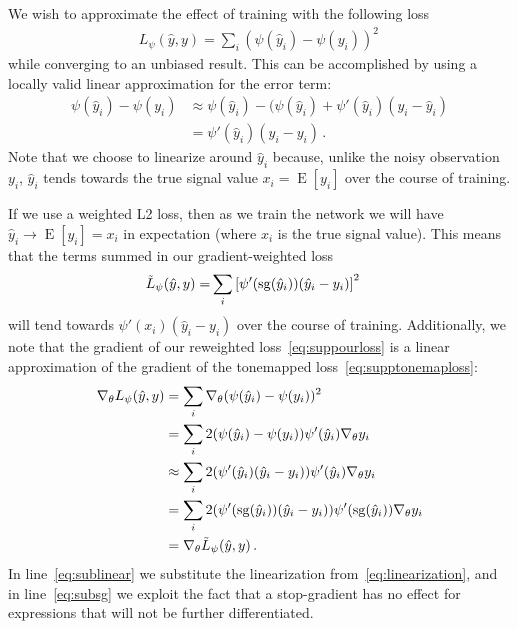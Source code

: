 We wish to approximate the effect of training with the following loss
\begin{align}
    L_\psi(\hat y, y) = \sum_i (\psi(\hat y_i) - \psi(y_i))^2\, 
    \label{eq:supptonemaploss}
\end{align}
while converging to an unbiased result. This can be accomplished by using a locally valid linear approximation for the error term:
\begin{align}
    \psi(\hat y_i) - \psi(y_i) &\approx \psi(\hat y_i) - (\psi(\hat y_i) + \psi'(\hat y_i) (y_i - \hat y_i) \nonumber \\
    &= \psi'(\hat y_i) (\hat y_i - y_i) \, .
    \label{eq:linearization}
\end{align}
Note that we choose to linearize around $\hat y_i$ because, unlike the noisy observation $y_i$, $\hat y_i$ tends towards the true signal value $x_i = \operatorname{E}[y_i]$ over the course of training.

If we use a weighted L2 loss, then as we train the network we will have $\hat y_i \to \operatorname{E}[y_i] = x_i$ in expectation (where $x_i$ is the true signal value). This means that the terms summed in our gradient-weighted loss
\begin{align}
   \tilde L_{\psi}(\hat y, y) = &\sum_i \left[\psi'(\mathrm{sg}(\hat y_i))(\hat y_i - y_i) \right]^2 
   \label{eq:suppourloss}
\end{align}
will tend towards  $\psi'(x_i)(\hat y_i - y_i)$ over the course of training. Additionally, we note that the gradient of our reweighted loss~\ref{eq:suppourloss} is a linear approximation of the gradient of the tonemapped loss~\ref{eq:supptonemaploss}:
\begin{align}
    \nabla_\theta L_\psi(\hat y, y) 
    &= \sum_i \nabla_\theta (\psi(\hat y_i) - \psi(y_i))^2 \\
    &= \sum_i 2(\psi(\hat y_i) - \psi(y_i))\psi'(\hat y_i) \nabla_\theta y_i \\
    &\approx \sum_i 2(\psi'(\hat y_i) (\hat y_i - y_i))\psi'(\hat y_i) \nabla_\theta y_i \label{eq:sublinear}\\
    &= \sum_i 2(\psi'(\mathrm{sg}(\hat y_i)) (\hat y_i - y_i)) \psi'(\mathrm{sg}(\hat y_i)) \nabla_\theta y_i \label{eq:subsg} \\
    &= \nabla_\theta \tilde L_{\psi}(\hat y, y) \, .
\end{align}
In line~\ref{eq:sublinear} we substitute the linearization from~\ref{eq:linearization}, and in line~\ref{eq:subsg} we exploit the fact that a stop-gradient has no effect for expressions that will not be further differentiated.



